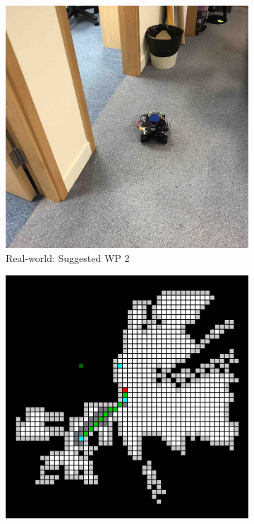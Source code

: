 \begin{figure}[h!]
  \begin{subfigure}[b]{0.32\linewidth}
    \includegraphics[width=\linewidth]{images/real/robo/3.JPG}
     \caption{Real-world: Suggested WP 2}
  \end{subfigure}
  \hfill
  \begin{subfigure}[b]{0.32\linewidth}
    \includegraphics[width=\linewidth]{images/real/sys/3_2.png}

\end{subfigure}
\end{figure}
